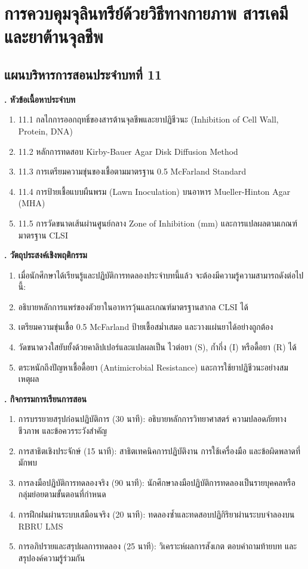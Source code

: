 \chapter{การควบคุมจุลินทรีย์ด้วยวิธีทางกายภาพ สารเคมี และยาต้านจุลชีพ}
\label{chap:ch11}

\section*{แผนบริหารการสอนประจำบทที่ 11}

\noindent\textbf{. หัวข้อเนื้อหาประจำบท}

\begin{enumerate}
    \item 11.1 กลไกการออกฤทธิ์ของสารต้านจุลชีพและยาปฏิชีวนะ (Inhibition of Cell Wall, Protein, DNA)
    \item 11.2 หลักการทดสอบ Kirby-Bauer Agar Disk Diffusion Method
    \item 11.3 การเตรียมความขุ่นของเชื้อตามมาตรฐาน 0.5 McFarland Standard
    \item 11.4 การป้ายเชื้อแบบผืนพรม (Lawn Inoculation) บนอาหาร Mueller-Hinton Agar (MHA)
    \item 11.5 การวัดขนาดเส้นผ่านศูนย์กลาง Zone of Inhibition (mm) และการแปลผลตามเกณฑ์มาตรฐาน CLSI
\end{enumerate}

\noindent\textbf{. วัตถุประสงค์เชิงพฤติกรรม}

\begin{enumerate}
    \item เมื่อนักศึกษาได้เรียนรู้และปฏิบัติการทดลองประจำบทนี้แล้ว จะต้องมีความรู้ความสามารถดังต่อไปนี้:
    \item อธิบายหลักการแพร่ของตัวยาในอาหารวุ้นและเกณฑ์มาตรฐานสากล CLSI ได้
    \item เตรียมความขุ่นเชื้อ 0.5 McFarland ป้ายเชื้อสม่ำเสมอ และวางแผ่นยาได้อย่างถูกต้อง
    \item วัดขนาดวงใสยับยั้งด้วยคาลิปเปอร์และแปลผลเป็น ไวต่อยา (S), ก้ำกึ่ง (I) หรือดื้อยา (R) ได้
    \item ตระหนักถึงปัญหาเชื้อดื้อยา (Antimicrobial Resistance) และการใช้ยาปฏิชีวนะอย่างสมเหตุผล
\end{enumerate}

\noindent\textbf{. กิจกรรมการเรียนการสอน}

\begin{enumerate}
    \item การบรรยายสรุปก่อนปฏิบัติการ (30 นาที): อธิบายหลักการวิทยาศาสตร์ ความปลอดภัยทางชีวภาพ และข้อควรระวังสำคัญ
    \item การสาธิตเชิงประจักษ์ (15 นาที): สาธิตเทคนิคการปฏิบัติงาน การใช้เครื่องมือ และข้อผิดพลาดที่มักพบ
    \item การลงมือปฏิบัติการทดลองจริง (90 นาที): นักศึกษาลงมือปฏิบัติการทดลองเป็นรายบุคคลหรือกลุ่มย่อยตามขั้นตอนที่กำหนด
    \item การฝึกฝนผ่านระบบเสมือนจริง (20 นาที): ทดลองซ้ำและทดสอบปฏิกิริยาผ่านระบบจำลองบน RBRU LMS
    \item การอภิปรายและสรุปผลการทดลอง (25 นาที): วิเคราะห์ผลการสังเกต ตอบคำถามท้ายบท และสรุปองค์ความรู้ร่วมกัน
\end{enumerate}


